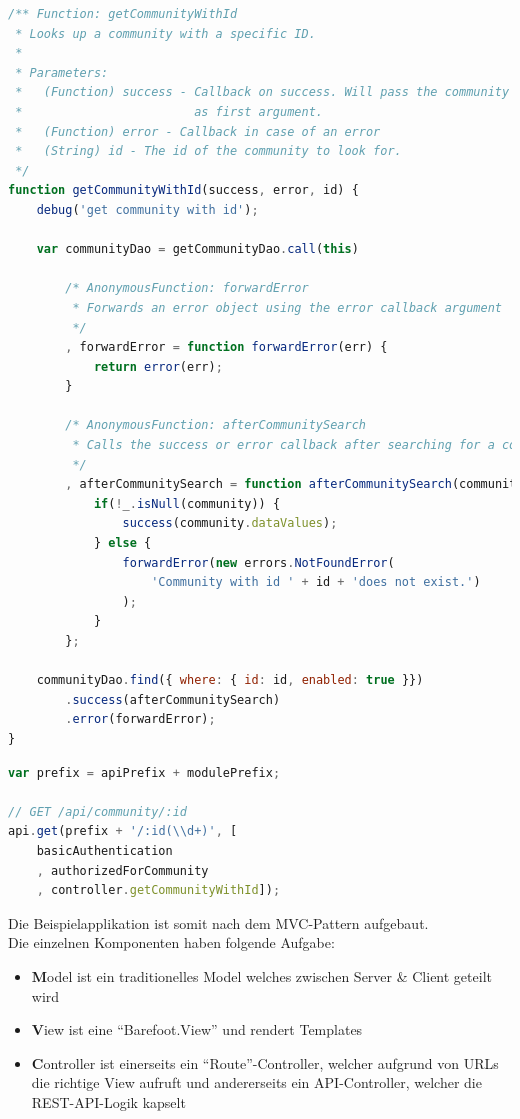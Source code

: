 \begin{lstlisting}[language=JavaScript, caption=API-Controller Beispiel \cite{roomiesCommunityApiExample}, label=lst:roomiesControllerExample, firstnumber=294]
/** Function: getCommunityWithId
 * Looks up a community with a specific ID.
 *
 * Parameters:
 *   (Function) success - Callback on success. Will pass the community data
 *                        as first argument.
 *   (Function) error - Callback in case of an error
 *   (String) id - The id of the community to look for.
 */
function getCommunityWithId(success, error, id) {
	debug('get community with id');

	var communityDao = getCommunityDao.call(this)

		/* AnonymousFunction: forwardError
		 * Forwards an error object using the error callback argument
		 */
		, forwardError = function forwardError(err) {
			return error(err);
		}

		/* AnonymousFunction: afterCommunitySearch
		 * Calls the success or error callback after searching for a community.
		 */
		, afterCommunitySearch = function afterCommunitySearch(community) {
			if(!_.isNull(community)) {
				success(community.dataValues);
			} else {
				forwardError(new errors.NotFoundError(
					'Community with id ' + id + 'does not exist.')
				);
			}
		};

	communityDao.find({ where: { id: id, enabled: true }})
		.success(afterCommunitySearch)
		.error(forwardError);
}
\end{lstlisting}

\begin{lstlisting}[language=JavaScript, caption=API-Route Beispiel \cite{communityApiDefinition}, label=lst:roomiesComponentExample, firstnumber=31]
var prefix = apiPrefix + modulePrefix;

// GET /api/community/:id
api.get(prefix + '/:id(\\d+)', [
	basicAuthentication
	, authorizedForCommunity
	, controller.getCommunityWithId]);
\end{lstlisting}

Die Beispielapplikation ist somit nach dem MVC-Pattern aufgebaut. \\
Die einzelnen Komponenten haben folgende Aufgabe:
\begin{itemize}
	\item{\textbf{M}odel ist ein traditionelles Model welches zwischen Server \& Client geteilt wird}
	\item{\textbf{V}iew ist eine ``Barefoot.View'' \cite{BarefootView} und rendert Templates}
	\item{\textbf{C}ontroller ist einerseits ein ``Route''-Controller, welcher aufgrund von URLs die richtige View aufruft und andererseits ein API-Controller, welcher die REST-API-Logik kapselt}
\end{itemize}

